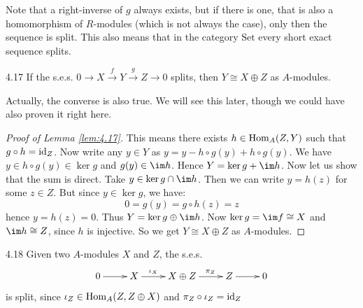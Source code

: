 \documentclass[twoside = false,	%
		headsepline,		%
		parskip = true,
		]{scrbook}						%
\begin{document}
    Note that a right-inverse of $g$ always exists, but if there is one, that is also a homomorphism of $R$-modules (which is not always the case), only then the sequence is split. This also means that in the category $\mathrm{Set}$ every short exact sequence splits.

    \begin{lemma}{}{4.17}
        If the s.e.s. $0 \to X \xrightarrow{f} Y \xrightarrow{g} Z \to 0$ splits, then $Y \cong X \oplus Z$ as $A$-modules.
    \end{lemma}
    Actually, the converse is also true. We will see this later, though we could have also proven it right here.
    \begin{proof}[Proof of Lemma \ref{lem:4.17}]
        This means there exists $h \in \mathrm{Hom}_A(Z,Y)$ such that $g \circ h = \mathrm{id}_Z$. Now write any $y \in Y$ as $y = y - h \circ g (y) + h \circ g (y)$. We have $y \in h \circ g (y) \in \ker g$ and $g(y) \in \im h$. Hence $Y = \ker g + \im h$. Now let us show that the sum is direct. Take $y \in \ker g \cap \im h$. Then we can write $y = h(z)$ for some $z \in Z$. But since $y \in \ker g$, we have:
        \begin{equation*}
            0 = g(y) = g \circ h (z) = z
        \end{equation*}
        hence $y = h(z) = 0$. Thus $Y = \ker g \oplus \im h$. Now $\ker g = \im f \cong X$ and $\im h \cong Z$, since $h$ is injective. So we get $Y \cong X \oplus Z$ as $A$-modules.
    \end{proof}

    \begin{example}{}{4.18}
        Given two $A$-modules $X$ and $Z$, the s.e.s.
        \begin{equation*}
            \xymatrix {
                0 \ar[r] & X \ar[r]^(.4){\iota_X} & X \oplus Z \ar[r]^(.6){\pi_Z} & Z \ar[r]& 0
            }
        \end{equation*}
        is split, since $\iota_Z \in \mathrm{Hom}_A(Z,Z \oplus X)$ and $\pi_Z \circ \iota_Z = \mathrm{id}_Z$
    \end{example}
\end{document}
